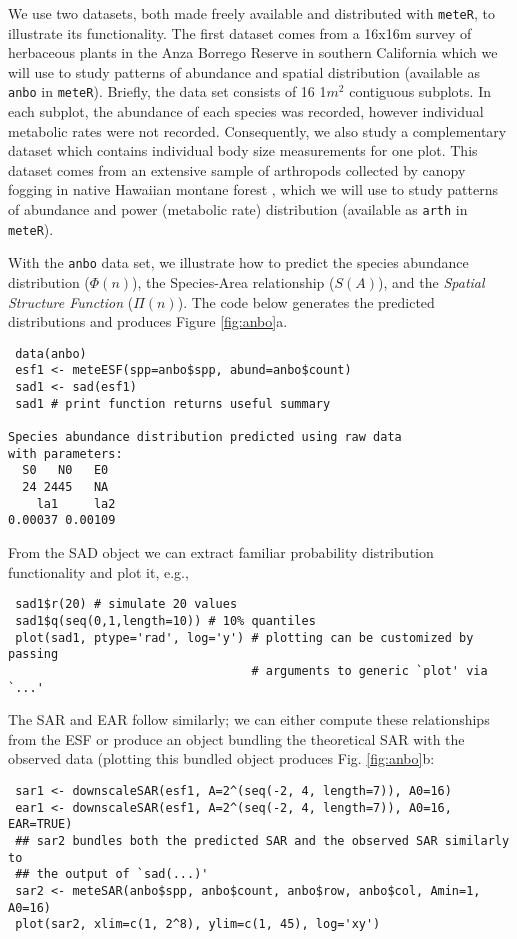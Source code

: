 We use two datasets, both made freely available and distributed with
\texttt{meteR}, to illustrate its functionality. The first dataset
comes from a 16x16m survey of herbaceous plants in the Anza Borrego
Reserve in southern California \cite{Harte:2011ut} which we will use
to study patterns of abundance and spatial distribution (available as
\texttt{anbo} in \texttt{meteR}). Briefly, the data set consists of 16
1$m^2$ contiguous subplots. In each subplot, the abundance of each
species was recorded, however individual metabolic rates were not
recorded. Consequently, we also study a complementary dataset which
contains individual body size measurements for one plot. This dataset
comes from an extensive sample of arthropods collected by canopy
fogging in native Hawaiian montane forest \cite{gruner2007}, which we
will use to study patterns of abundance and power (metabolic rate)
distribution (available as \texttt{arth} in \texttt{meteR}).

With the \texttt{anbo} data set, we illustrate how to predict the species
abundance distribution ($\Phi(n)$), the Species-Area relationship
($S(A)$), and the \textit{Spatial Structure Function} ($\Pi(n)$). The
code below generates the predicted distributions and produces Figure
\ref{fig:anbo}a.

\begin{verbatim}
 data(anbo)
 esf1 <- meteESF(spp=anbo$spp, abund=anbo$count)          
 sad1 <- sad(esf1)
 sad1 # print function returns useful summary

Species abundance distribution predicted using raw data 
with parameters: 
  S0   N0   E0 
  24 2445   NA 
    la1     la2 
0.00037 0.00109 
\end{verbatim}

From the SAD object we can extract familiar probability distribution
functionality and plot it, e.g.,

\begin{verbatim}
 sad1$r(20) # simulate 20 values
 sad1$q(seq(0,1,length=10)) # 10% quantiles
 plot(sad1, ptype='rad', log='y') # plotting can be customized by passing 
                                  # arguments to generic `plot' via `...'
\end{verbatim}

The SAR and EAR follow similarly; we can either compute these
relationships from the ESF or produce an object bundling the
theoretical SAR with the observed data (plotting this bundled object
produces Fig. \ref{fig:anbo}b:

\begin{verbatim}
 sar1 <- downscaleSAR(esf1, A=2^(seq(-2, 4, length=7)), A0=16)
 ear1 <- downscaleSAR(esf1, A=2^(seq(-2, 4, length=7)), A0=16, EAR=TRUE)
 ## sar2 bundles both the predicted SAR and the observed SAR similarly to 
 ## the output of `sad(...)'
 sar2 <- meteSAR(anbo$spp, anbo$count, anbo$row, anbo$col, Amin=1, A0=16)
 plot(sar2, xlim=c(1, 2^8), ylim=c(1, 45), log='xy')
\end{verbatim}

